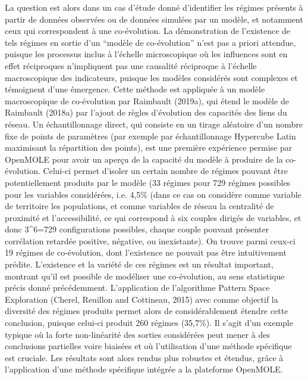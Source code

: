 \documentclass[10pt]{article}
\begin{document}
La question est alors dans un cas d'étude donné d’identifier les régimes présents à partir de données observées ou de données simulées par un modèle, et notamment ceux qui correspondent à une co-évolution. La démonstration de l’existence de tels régimes en sortie d’un “modèle de co-évolution” n’est pas a priori attendue, puisque les processus inclus à l'échelle microscopique où les influences sont en effet réciproques n’impliquent pas une causalité réciproque à l'échelle macroscopique des indicateurs, puisque les modèles considérés sont complexes et témoignent d’une émergence. Cette méthode est appliquée à un modèle macroscopique de co-évolution par Raimbault (2019a), qui étend le modèle de Raimbault (2018a) par l’ajout de règles d'évolution des capacités des liens du réseau. Un échantillonnage direct, qui consiste en un tirage aléatoire d’un nombre fixe de points de paramètres (par exemple par échantillonnage Hypercube Latin maximisant la répartition des points), est une première expérience permise par OpenMOLE pour avoir un aperçu de la capacité du modèle à produire de la co-évolution. Celui-ci permet d’isoler un certain nombre de régimes pouvant être potentiellement produits par le modèle (33 régimes pour 729 régimes possibles pour les variables considérées, i.e.  4,5\%  (dans ce cas on considère comme variable de territoire les populations, et comme variables de réseau la centralité de proximité et l'accessibilité, ce qui correspond à six couples dirigés de variables, et donc 3^6=729 configurations possibles, chaque couple pouvant présenter corrélation retardée positive, négative, ou inexistante). On trouve parmi ceux-ci 19 régimes de co-évolution, dont l’existence ne pouvait pas être intuitivement prédite. L’existence et la variété de ces régimes est un résultat important, montrant qu’il est possible de modéliser une co-évolution, au sens statistique précis donné précédemment.
L’application de l’algorithme Pattern Space Exploration (Cherel, Reuillon and Cottineau, 2015) avec comme objectif la diversité des régimes produits permet alors de considérablement étendre cette conclusion, puisque celui-ci produit 260 régimes (35,7\%). Il s’agit d’un exemple typique où la forte non-linéarité des sorties considérées peut mener à des conclusions partielles voire biaisées et où l’utilisation d’une méthode spécifique est cruciale. Les résultats sont alors rendus plus robustes et étendus, grâce à l’application d’une méthode spécifique intégrée a la plateforme OpenMOLE.
\end{document}

